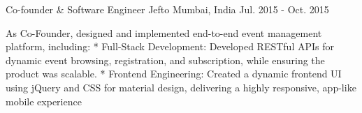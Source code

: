 \begin{cventries}
	\cventry
    {Co-founder \& Software Engineer} %
    {Jefto} %
    {Mumbai, India} %
    {Jul. 2015 - Oct. 2015} %
    {
      \begin{cvitems} %
        \item {As Co-Founder, designed and implemented end-to-end event management platform, including: * Full-Stack Development: Developed RESTful APIs for dynamic event browsing, registration, and subscription, while ensuring the product was scalable. * Frontend Engineering: Created a dynamic frontend UI using jQuery and CSS for material design, delivering a highly responsive, app-like mobile experience}
      \end{cvitems}
    }

\end{cventries}


